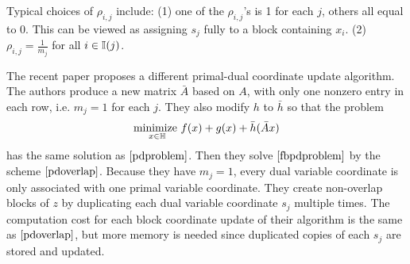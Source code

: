 {{{Typical choices of $\rho_{i,j}$ include: (1) one of the $\rho_{i,j}$'s is 1 for each $j$, others all equal to 0. This can be viewed as assigning $s_j$ fully to a block containing $x_i$.
(2) $\rho_{i,j}=\frac{1}{m_j}$ for all $i\in\mathbb{I}(j)$.

\begin{remark}
The recent paper \cite{fercoq2015coordinate} proposes a different primal-dual coordinate update algorithm. 
The authors produce a new matrix $\bar{A}$ based on $A$, with only one nonzero entry in each row, i.e. $m_j=1$ for each $j$. They also modify $h$ to $\bar{h}$ so that the problem
\begin{equation}
\underset{x\in\mathbb{H}}{\textnormal{minimize }} f(x)+g(x)+\bar{h}(\bar{A}x)\label{fbpdproblem}
\end{equation}
has the same solution as $\eqref{pdproblem}$. Then they solve $\eqref{fbpdproblem}$ by the scheme $\eqref{pdoverlap}$. Because they have $m_j=1$, every dual variable coordinate is only associated with one primal variable coordinate. 
They create non-overlap blocks of $z$ by duplicating each dual variable coordinate $s_j$ multiple times. The computation cost for each block coordinate update of their algorithm is the same as $\eqref{pdoverlap}$, but more memory is needed since duplicated copies of each $s_j$ are stored and updated.
\end{remark}


}}}
